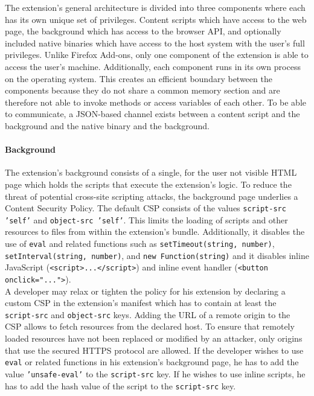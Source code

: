 	The extension's general architecture is divided into three components where each has its own unique set of privileges. Content scripts which have access to the web page, the background which has access to the browser API, and optionally included native binaries which have access to the host system with the user's full privileges. Unlike Firefox Add-ons, only one component of the extension is able to access the user's machine. Additionally, each component runs in its own process on the operating system. This creates an efficient boundary between the components because they do not share a common memory section and are therefore not able to invoke methods or access variables of each other. To be able to communicate, a JSON-based channel exists between a content script and the background and the native binary and the background. 
		
\paragraph{Background}
	
	The extension's background consists of a single, for the user not visible HTML page which holds the scripts that execute the extension's logic. To reduce the threat of potential cross-site scripting attacks, the background page underlies a Content Security Policy. The default CSP consists of the values \texttt{script-src 'self'} and \texttt{object-src 'self'}. This limits the loading of scripts and other resources to files from within the extension's bundle. Additionally, it disables the use of \texttt{eval} and related functions such as \texttt{setTimeout(string, number)}, \texttt{setInterval(string, number)}, and \texttt{new Function(string)} and it disables inline JavaScript (\texttt{<script>...</script>}) and inline event handler (\texttt{<button onclick="...">}). \\
	A developer may relax or tighten the policy for his extension by declaring a custom CSP in the extension's manifest which has to contain at least the \texttt{script-src} and \texttt{object-src} keys. Adding the URL of a remote origin to the CSP allows to fetch resources from the declared host. To ensure that remotely loaded resources have not been replaced or modified by an attacker, only origins that use the secured HTTPS protocol are allowed. If the developer wishes to use \texttt{eval} or related functions in his extension's background page, he has to add the value \texttt{'unsafe-eval'} to the \texttt{script-src} key. If he wishes to use inline scripts, he has to add the hash value of the script to the \texttt{script-src} key.
	
